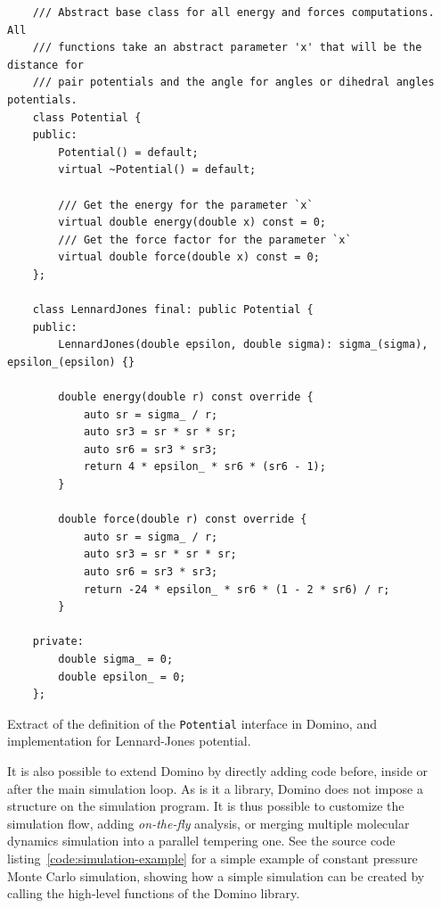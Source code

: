 \documentclass[thesis]{subfiles}
\begin{document}
\newpage
\begin{listing}[ht]
    \begin{verbatim}
    /// Abstract base class for all energy and forces computations. All
    /// functions take an abstract parameter 'x' that will be the distance for
    /// pair potentials and the angle for angles or dihedral angles potentials.
    class Potential {
    public:
        Potential() = default;
        virtual ~Potential() = default;

        /// Get the energy for the parameter `x`
        virtual double energy(double x) const = 0;
        /// Get the force factor for the parameter `x`
        virtual double force(double x) const = 0;
    };

    class LennardJones final: public Potential {
    public:
        LennardJones(double epsilon, double sigma): sigma_(sigma), epsilon_(epsilon) {}

        double energy(double r) const override {
            auto sr = sigma_ / r;
            auto sr3 = sr * sr * sr;
            auto sr6 = sr3 * sr3;
            return 4 * epsilon_ * sr6 * (sr6 - 1);
        }

        double force(double r) const override {
            auto sr = sigma_ / r;
            auto sr3 = sr * sr * sr;
            auto sr6 = sr3 * sr3;
            return -24 * epsilon_ * sr6 * (1 - 2 * sr6) / r;
        }

    private:
        double sigma_ = 0;
        double epsilon_ = 0;
    };
    \end{verbatim}
    \caption{Extract of the definition of the \texttt{Potential} interface in
    Domino, and implementation for Lennard-Jones potential.}
    \label{code:potential}
\end{listing}

It is also possible to extend Domino by directly adding code before, inside or
after the main simulation loop. As is it a library, Domino does not impose a
structure on the simulation program. It is thus possible to customize the
simulation flow, adding \emph{on-the-fly} analysis, or merging multiple
molecular dynamics simulation into a parallel tempering one. See the source code
listing~\ref{code:simulation-example} for a simple example of constant pressure
Monte Carlo simulation, showing how a simple simulation can be created by
calling the high-level functions of the Domino library.
\end{document}
